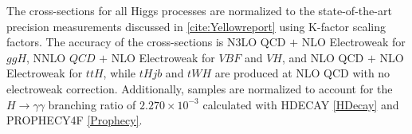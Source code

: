 \begin{table}[h!]
  \centering
  \caption{Summary of alternative signal samples}
  \label{tab:signal_samples_herwig}
\end{table}  

The cross-sections for all Higgs processes are normalized to the state-of-the-art precision measurements discussed in \ref{cite:Yellowreport} using K-factor scaling factors. The accuracy of the cross-sections is N3LO QCD $+$ NLO Electroweak for $ggH$, NNLO $QCD$ $+$ NLO Electroweak for $VBF$ and $VH$, and NLO QCD $+$ NLO Electroweak for $ttH$, while $tHjb$ and $tWH$ are produced at NLO QCD with no electroweak correction. Additionally, samples are normalized to account for the $H \rightarrow \gamma \gamma$ branching ratio of $2.270 \times 10^{-3}$ calculated with HDECAY \ref{HDecay} and PROPHECY4F \ref{Prophecy}.

